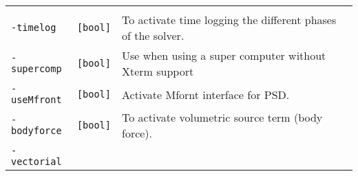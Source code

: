\begin{longtable}[]{@{}lll@{}}
\begin{minipage}[t]{0.56\columnwidth}
\end{minipage}\tabularnewline
\begin{minipage}[t]{0.26\columnwidth}\raggedright\strut
\lstinline!-timelog!\strut
\end{minipage} & \begin{minipage}[t]{0.09\columnwidth}\raggedright\strut
\lstinline![bool]!\strut
\end{minipage} & \begin{minipage}[t]{0.56\columnwidth}\raggedright\strut
To activate time logging the different phases of the solver.\strut
\end{minipage}\tabularnewline
\begin{minipage}[t]{0.26\columnwidth}\raggedright\strut
\lstinline!-supercomp!\strut
\end{minipage} & \begin{minipage}[t]{0.09\columnwidth}\raggedright\strut
\lstinline![bool]!\strut
\end{minipage} & \begin{minipage}[t]{0.56\columnwidth}\raggedright\strut
Use when using a super computer without Xterm support\strut
\end{minipage}\tabularnewline
\begin{minipage}[t]{0.26\columnwidth}\raggedright\strut
\lstinline!-useMfront!\strut
\end{minipage} & \begin{minipage}[t]{0.09\columnwidth}\raggedright\strut
\lstinline![bool]!\strut
\end{minipage} & \begin{minipage}[t]{0.56\columnwidth}\raggedright\strut
Activate Mfornt interface for PSD.\strut
\end{minipage}\tabularnewline
\begin{minipage}[t]{0.26\columnwidth}\raggedright\strut
\lstinline!-bodyforce!\strut
\end{minipage} & \begin{minipage}[t]{0.09\columnwidth}\raggedright\strut
\lstinline![bool]!\strut
\end{minipage} & \begin{minipage}[t]{0.56\columnwidth}\raggedright\strut
To activate volumetric source term (body force).\strut
\end{minipage}\tabularnewline
\begin{minipage}[t]{0.26\columnwidth}\raggedright\strut
\lstinline!-vectorial!\strut
\end{minipage} & \begin{minipage}[t]{0.09\columnwidth}\raggedright\strut

\end{minipage}
\end{longtable}

